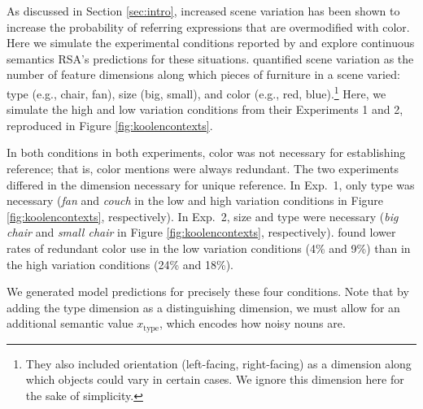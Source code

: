 \documentclass[11pt]{article}
\newcommand{\figref}[1]{Figure \ref{#1}}
\newcommand{\sectionref}[1]{Section \ref{#1}}
\begin{document}
As discussed in \sectionref{sec:intro}, increased scene variation has been shown to increase the probability of referring expressions that are overmodified with color. Here we simulate the experimental conditions reported by  and explore continuous semantics RSA's predictions for these situations.   quantified scene variation as the number of feature dimensions along which pieces of furniture in a scene varied: type (e.g., chair, fan), size (big, small), and color (e.g., red, blue).\footnote{They also included orientation (left-facing, right-facing) as a dimension along which objects could vary in certain cases. We ignore this dimension here for the sake of simplicity.} Here, we  simulate the high and low variation conditions from their Experiments 1 and 2, reproduced in \figref{fig:koolencontexts}. 

In both conditions in both experiments, color was not necessary for establishing reference; that is, color mentions were always redundant. The two experiments differed in the dimension necessary for unique reference. In Exp.~1, only type was necessary (\emph{fan} and \emph{couch} in the low and high variation conditions in \figref{fig:koolencontexts}, respectively). In Exp.~2, size and type were necessary (\emph{big chair} and \emph{small chair} in \figref{fig:koolencontexts}, respectively).  found lower rates of redundant color use in the low variation conditions (4\% and 9\%) than in the high variation conditions (24\% and 18\%).

We generated model predictions for precisely these four conditions. Note that by adding the type dimension as a distinguishing dimension, we must allow for an additional semantic value $x_{\text{type}}$, which encodes how noisy nouns are.
\end{document}
